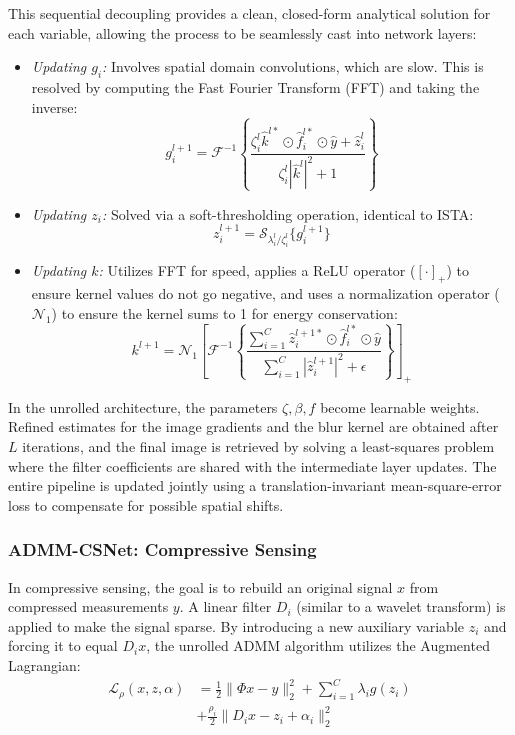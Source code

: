\documentclass[conference]{IEEEtran}
\begin{document}
This sequential decoupling provides a clean, closed-form analytical solution for each variable, allowing the process to be seamlessly cast into network layers:
\begin{itemize}
    \item \textit{Updating $g_i$:} Involves spatial domain convolutions, which are slow. This is resolved by computing the Fast Fourier Transform (FFT) and taking the inverse:
    \begin{equation}
    g_i^{l+1} = \mathcal{F}^{-1} \left\{ \frac{\zeta_i^l \hat{k}^{l*} \odot \hat{f}_i^{l*} \odot \hat{y} + \hat{z}_i^l}{\zeta_i^l |\hat{k}^l|^2 + 1} \right\}
    \end{equation}
    \item \textit{Updating $z_i$:} Solved via a soft-thresholding operation, identical to ISTA:
    \begin{equation}
    z_i^{l+1} = \mathcal{S}_{\lambda_i^l / \zeta_i^l}\{g_i^{l+1}\}
    \end{equation}
    \item \textit{Updating $k$:} Utilizes FFT for speed, applies a ReLU operator ($[\cdot]_+$) to ensure kernel values do not go negative, and uses a normalization operator ($\mathcal{N}_1$) to ensure the kernel sums to 1 for energy conservation:
    \begin{equation}
    k^{l+1} = \mathcal{N}_1 \left[ \mathcal{F}^{-1} \left\{ \frac{\sum_{i=1}^C \hat{z}_i^{l+1*} \odot \hat{f}_i^{l*} \odot \hat{y}}{\sum_{i=1}^C |\hat{z}_i^{l+1}|^2 + \epsilon} \right\} \right]_+
    \end{equation}
\end{itemize}

In the unrolled architecture, the parameters $\zeta, \beta, f$ become learnable weights. Refined estimates for the image gradients and the blur kernel are obtained after $L$ iterations, and the final image is retrieved by solving a least-squares problem where the filter coefficients are shared with the intermediate layer updates. The entire pipeline is updated jointly using a translation-invariant mean-square-error loss to compensate for possible spatial shifts.

\subsubsection{ADMM-CSNet: Compressive Sensing}
In compressive sensing, the goal is to rebuild an original signal $x$ from compressed measurements $y$. A linear filter $D_i$ (similar to a wavelet transform) is applied to make the signal sparse. By introducing a new auxiliary variable $z_i$ and forcing it to equal $D_i x$, the unrolled ADMM algorithm utilizes the Augmented Lagrangian:
\begin{equation}
\begin{aligned}
\mathcal{L}_\rho(x, z, \alpha) &= \frac{1}{2}\|\Phi x - y\|_2^2 + \sum_{i=1}^C \lambda_i g(z_i) \\
&+ \frac{\rho_i}{2}\|D_i x - z_i + \alpha_i\|_2^2
\end{aligned}
\end{equation}
\end{document}
